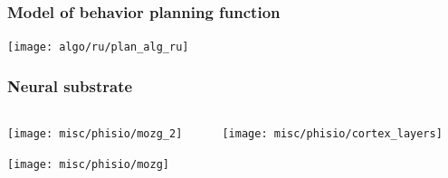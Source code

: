 \documentclass[default]{beamer}
\begin{document}
	\begin{frame}
		\frametitle{Model of behavior planning function}
		\centering
		\texttt{[image: algo/ru/plan\_alg\_ru]}
	\end{frame}	

	\begin{frame}
		\frametitle{Neural substrate}
		
		\begin{columns}
			\begin{column}{0.35\textwidth}
				\texttt{[image: misc/phisio/mozg\_2]}
				\par\bigskip
				\hspace{-7mm}\texttt{[image: misc/phisio/mozg]}
			\end{column}
			\begin{column}{0.65\textwidth}
				\texttt{[image: misc/phisio/cortex\_layers]}
			\end{column}
		\end{columns}
		\nocite{*}
		\printbibliography[keyword={column}, resetnumbers=true]
	\end{frame}
	
\end{document}
